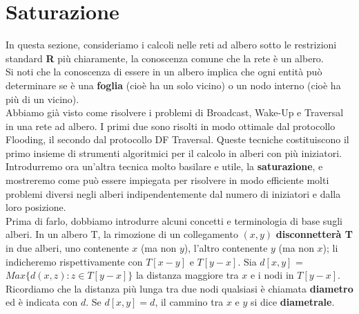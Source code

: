 \chapter{Saturazione}\label{cap:saturazione}
In questa sezione, consideriamo i calcoli nelle reti ad albero sotto le restrizioni standard \textbf{R} più chiaramente, la conoscenza comune che la rete è un albero.\\
Si noti che la conoscenza di essere in un albero implica che ogni entità può determinare se è una \textbf{foglia} (cioè ha un solo vicino) o un nodo interno (cioè ha più di un vicino).\\
Abbiamo già visto come risolvere i problemi di Broadcast, Wake-Up e Traversal in una rete ad albero. I primi due sono risolti in modo ottimale dal protocollo Flooding, il secondo dal protocollo DF Traversal. Queste tecniche costituiscono il primo insieme di strumenti algoritmici per il calcolo in alberi con più iniziatori. Introdurremo ora un'altra tecnica molto basilare e utile, la \textbf{saturazione}, e mostreremo come può essere impiegata per risolvere in modo efficiente molti problemi diversi negli alberi indipendentemente dal numero di iniziatori e dalla loro posizione.\\
Prima di farlo, dobbiamo introdurre alcuni concetti e terminologia di base sugli alberi. In un albero T, la rimozione di un collegamento $(x,y)$ \textbf{disconnetterà T} in due alberi, uno contenente $x$ (ma non $y$), l'altro contenente $y$ (ma non $x$); li indicheremo rispettivamente con $T[x - y]$ e $T[y - x]$. Sia $d[x, y]$ = $Max\{d(x, z) : z \in T[y - x]\}$ la distanza maggiore tra $x$ e i nodi in $T[y - x]$. Ricordiamo che la distanza più lunga tra due nodi qualsiasi è chiamata \textbf{diametro} ed è indicata con $d$. Se $d[x, y] = d$, il cammino tra $x$ e $y$ si dice \textbf{diametrale}.

